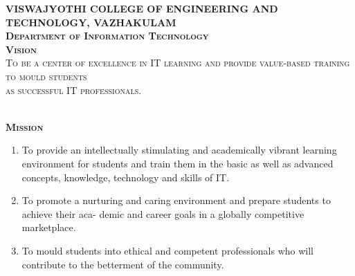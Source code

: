 \documentclass[10pt,a4paper]{report}
\begin{document}
\newpage
\thispagestyle{empty}





\begin{center}

\textsc{\large\bfseries VISWAJYOTHI COLLEGE OF ENGINEERING AND}\\
[0.15cm]
\textsc{\large\bfseries TECHNOLOGY, VAZHAKULAM}\\
[0.50cm]
\textsc{\large\bfseries\upshape Department of Information Technology}\\
[1cm]
\textsc{\large\bfseries\upshape Vision}\\
[0.50cm]
\textsc{\large\mdseries\upshape To be a center of excellence in IT learning and provide value-based training to mould students}\\
[0.10cm]
\textsc{\large\mdseries\upshape as successful IT professionals.}\\

\begin{center}

\textsc{\large\bfseries }\\
[0.50cm]
\textsc{\large\bfseries\upshape Mission}\\
[0.50cm]
\justify
\begin{enumerate}
\item\large To provide an intellectually stimulating and academically vibrant learning environment for
students and train them in the basic as well as advanced concepts, knowledge, technology and
skills of IT.
\vspace{0.3cm}
\item\large To promote a nurturing and caring environment and prepare students to achieve their aca-
demic and career goals in a globally competitive marketplace.
\vspace{0.3cm}
\item\large To mould students into ethical and competent professionals who will contribute to the
betterment of the community.

\end{enumerate}

\end{center}

\begin{center}


\end{center}
\end{center}
\end{document}
